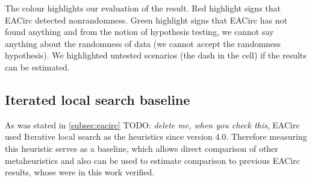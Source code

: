 \documentclass[
  print, %
  Table,   %
  nolof,     %
  nolot,     %
  11pt, %
  oneside  %
]{fithesis3}
\newcommand{\todo}[1]{TODO: \textit{#1}}
\begin{document}
The colour highlights our evaluation of the result. Red highlight signs that EACirc detected nonrandomness. Green highlight signs that EACirc has not found anything and from the notion of hypothesis testing, we cannot say anything about the randomness of data (we cannot accept the randomness hypothesis). We highlighted untested scenarios (the dash in the cell) if the results can be estimated.

\subsection{Iterated local search baseline}
\label{subsec:res-ss-ils}

As was stated in \cref{subsec:eacirc} \todo{delete me, when you check this}, EACirc used Iterative local search as the heuristics since version 4.0. Therefore measuring this heuristic serves as a baseline, which allows direct comparison of other metaheuristics and also can be used to estimate comparison to previous EACirc results, whose were in this work verified.
\end{document}
